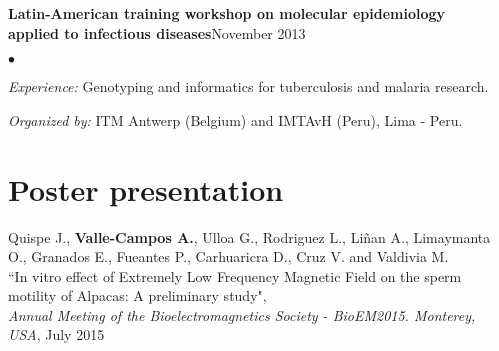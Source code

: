 \documentclass[margin,line]{res}
\newenvironment{list2}{
  \begin{list}{$\bullet$}{%
      \setlength{\itemsep}{0in}
      \setlength{\parsep}{0in} \setlength{\parskip}{0in}
      \setlength{\topsep}{0in} \setlength{\partopsep}{0in}
      \setlength{\leftmargin}{0.2in}}}{\end{list}}
\begin{document}
\begin{resume}


{\bf Latin-American training workshop on molecular epidemiology \\applied to infectious diseases}\hfill {November 2013}\\
	\vspace*{-.1in}%
\begin{list2} %
	\item \textit{Experience:} Genotyping and informatics for tuberculosis and malaria research. %
	\item \textit{Organized by:} ITM Antwerp (Belgium) and IMTAvH (Peru), Lima - Peru.\\
\end{list2}



\section{\sc Poster presentation}

Quispe J., \textbf{Valle-Campos A.}, Ulloa G., Rodriguez L., Liñan A., Limaymanta O., Granados E., Fueantes P., Carhuaricra D., Cruz V. and Valdivia M.\\ ``In vitro effect of Extremely Low Frequency Magnetic Field on the sperm motility of Alpacas: A preliminary study", \\ {\em Annual Meeting of the Bioelectromagnetics Society - BioEM2015. Monterey, USA}, July 2015\\





\end{resume}
\end{document}
